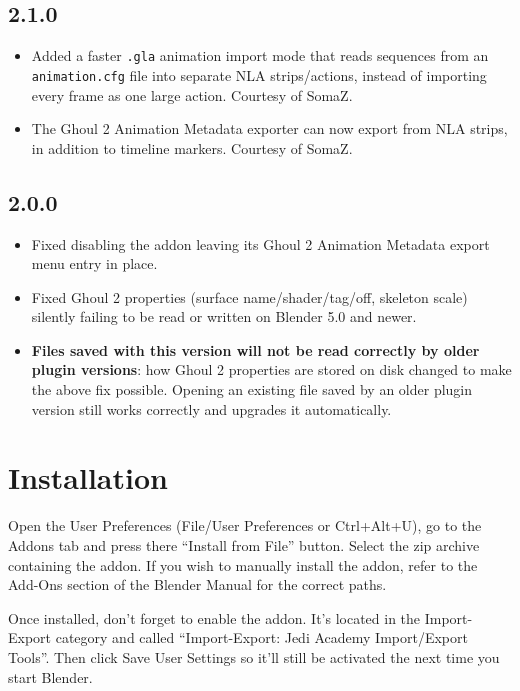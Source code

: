 \documentclass[a4paper,10pt]{article}
\begin{document}
 \subsection*{2.1.0}
 \begin{itemize}
  \item Added a faster \texttt{.gla} animation import mode that reads sequences from an
  \texttt{animation.cfg} file into separate NLA strips/actions, instead of importing every frame
  as one large action. Courtesy of SomaZ.
  \item The Ghoul 2 Animation Metadata exporter can now export from NLA strips, in addition to
  timeline markers. Courtesy of SomaZ.
 \end{itemize}

 \subsection*{2.0.0}
 \begin{itemize}
  \item Fixed disabling the addon leaving its Ghoul 2 Animation Metadata export menu entry in place.
  \item Fixed Ghoul 2 properties (surface name/shader/tag/off, skeleton scale) silently failing to be
  read or written on Blender 5.0 and newer.
  \item \textbf{Files saved with this version will not be read correctly by older plugin versions}: how
  Ghoul 2 properties are stored on disk changed to make the above fix possible. Opening an existing
  file saved by an older plugin version still works correctly and upgrades it automatically.
 \end{itemize}

 \section{Installation}
 
 Open the User Preferences (File/User Preferences or Ctrl+Alt+U), go to the Addons tab and press there
 ``Install from File'' button. Select the zip archive containing the addon. If you wish to manually install the
 addon, refer to the Add-Ons section of the Blender Manual for the correct paths.
 
 Once installed, don't forget to enable the addon. It's located in the Import-Export category and called
 ``Import-Export: Jedi Academy Import/Export Tools''. Then click Save User Settings so it'll still be activated
 the next time you start Blender.
\end{document}
